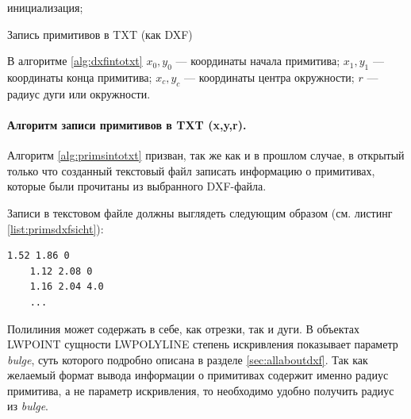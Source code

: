\begin{algorithm}[H]
	\SetAlgoLined
	инициализация;
	
	
	
	
	\caption{Запись примитивов в TXT (как DXF)}
	\label{alg:dxfintotxt}
\end{algorithm}

В алгоритме \ref{alg:dxfintotxt} $x_0, y_0$ --- координаты начала примитива; $x_1, y_1$ --- координаты конца примитива; $x_c, y_c$ --- координаты центра окружности; $r$ --- радиус дуги или окружности.

\paragraph{Алгоритм записи примитивов в TXT (x,y,r).} Алгоритм \ref{alg:primsintotxt} призван, так же как и в прошлом случае, в открытый только что созданный текстовый файл записать информацию о примитивах, которые были прочитаны из выбранного DXF-файла.

Записи в текстовом файле должны выглядеть следующим образом (см. листинг \ref{list:primsdxfsicht}):

\begin{lstlisting}[caption={Пример содержания TXT-файла (x, y, r)},label=list:primsdxfsicht]
	1.52 1.86 0
	1.12 2.08 0
	1.16 2.04 4.0
	...
\end{lstlisting}

Полилиния может содержать в себе, как отрезки, так и дуги. В объектах LWPOINT сущности LWPOLYLINE степень искривления показывает параметр \textit{bulge}, суть которого подробно описана в разделе \ref{sec:allaboutdxf}. Так как желаемый формат вывода информации о примитивах содержит именно радиус примитива, а не параметр искривления, то необходимо удобно получить радиус из \textit{bulge}.

